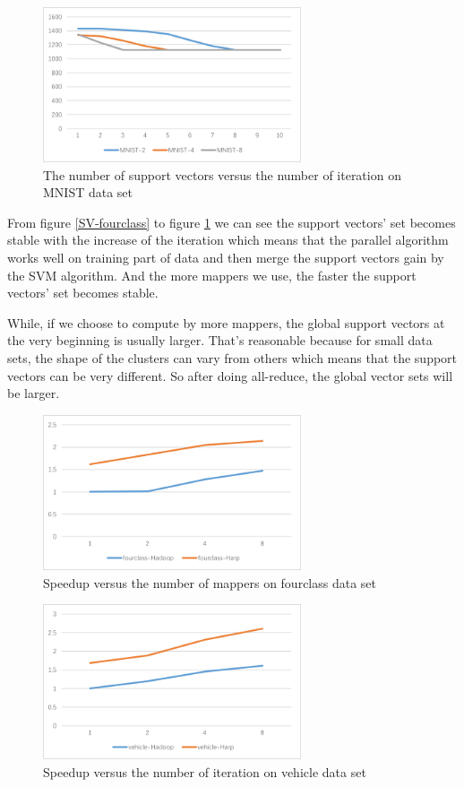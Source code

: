 \begin{figure}[htbp]
\centering
\includegraphics[width=3.0in]{image/SV-MNIST.png}
\caption{The number of support vectors versus the number of iteration on MNIST data set}
\label{SV-MNIST}
\end{figure}

From figure \ref{SV-fourclass} to figure \ref{SV-MNIST} we can see the support vectors' set becomes stable with the increase of the iteration which means that the parallel algorithm works well on training part of data and then merge the support vectors gain by the SVM algorithm. And the more mappers we use, the faster the support vectors' set becomes stable.

While, if we choose to compute by more mappers, the global support vectors at the very beginning is usually larger. That's reasonable because for small data sets, the shape of the clusters can vary from others which means that the support vectors can be very different. So after doing all-reduce, the global vector sets will be larger.

\begin{figure}[htbp]
\centering
\includegraphics[width=3.0in]{image/speed-fourclass.png}
\caption{Speedup versus the number of mappers on fourclass data set}
\label{speed-fourclass}
\end{figure}

\begin{figure}[htbp]
\centering
\includegraphics[width=3.0in]{image/speed-vehicle.png}
\caption{Speedup versus the number of iteration on vehicle data set}
\label{speed-vehicle}
\end{figure}

